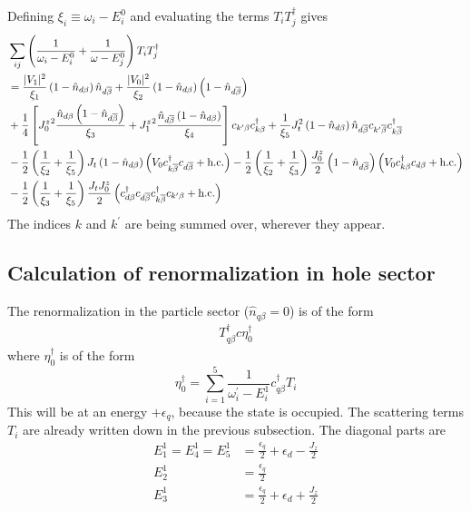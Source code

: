 \documentclass[12pt,twoside]{article}
\numberwithin{equation}{section}
\begin{document}
\pb Defining \(\xi_i \equiv \omega_i - E_i^0\) and evaluating the terms \(T_i T_j^\dagger\) gives
\begin{equation}\begin{aligned}
	&\sum_{ij} \left(\frac{1}{\omega_i - E^0_i} + \frac{1}{\omega - E^0_j}\right) T_i T_j^\dagger\\ 
	&=\frac{|V_1|^2}{\xi_1}\left( 1 - \hat n_{d\beta} \right) \hat n_{d\overline\beta} + \frac{|V_0|^2}{\xi_2}\left( 1 - \hat n_{d\beta} \right) \left( 1 - \hat n_{d\overline\beta} \right) \\
	&+ \frac{1}{4}\left[ {J_0^z}^2\frac{\hat n_{d\beta}\left( 1 - \hat n_{d\overline\beta} \right) }{\xi_3} + {J_1^z}^2\frac{\hat n_{d\overline\beta}\left( 1 - \hat n_{d\beta} \right)}{\xi_4} \right]c_{k^\prime\beta}c^\dagger_{k\beta} + \frac{1}{\xi_5}J_t^2 \left( 1 - \hat n_{d\beta} \right) \hat n_{d\overline\beta} c_{k^\prime\overline\beta}c^\dagger_{k\overline\beta} \\
	&- \frac{1}{2} \left(\frac{1}{\xi_2} + \frac{1}{\xi_5}\right)J_t\left( 1 - \hat n_{d\beta}\right) \left(V_0 c^\dagger_{k\overline\beta}c_{d\overline\beta} + \text{h.c.}\right) - \frac{1}{2}\left(\frac{1}{\xi_2} + \frac{1}{\xi_3}\right)\frac{J^z_0}{2}\left(1 - \hat n_{d\overline\beta}\right)\left(V_0 c^\dagger_{k\beta}c_{d\beta} + \text{h.c.}\right) \\
	&-\frac{1}{2}\left(\frac{1}{\xi_3} + \frac{1}{\xi_5}\right)\frac{J_t J^z_0}{2}\left(c^\dagger_{d\beta}c_{d\overline\beta}c^\dagger_{k\overline\beta}c_{k^\prime\beta} + \text{h.c.}\right)
\end{aligned}\end{equation}
The indices \(k\) and \(k^\prime\) are being summed over, wherever they appear.
\subsection{Calculation of renormalization in hole sector}
The renormalization in the particle sector (\(\hat n_{q\beta}=0\)) is of the form
\begin{equation}\begin{aligned}
	T^\dagger_{q\beta}c \eta_0^\dagger
\end{aligned}\end{equation}
where \(\eta_0^\dagger\) is of the form
\begin{equation}
	\eta_0^\dagger = \sum_{i=1}^5\frac{1}{\omega^\prime_i - E_i^1}c^\dagger_{q\beta} T_i
\end{equation}
This will be at an energy \(+\epsilon_q\), because the state is occupied. The scattering terms \(T_i\) are already written down in the previous subsection. The diagonal parts are
\begin{equation}\begin{aligned}
	E^1_1 = E^1_4 = E^1_5 &= \frac{\epsilon_q}{2} + \epsilon_d - \frac{J_z}{2}\\
	E^1_2 &= \frac{\epsilon_q}{2}\\
	E^1_3 &= \frac{\epsilon_q}{2} + \epsilon_d + \frac{J_z}{2} \\
\end{aligned}\end{equation}
\end{document}
